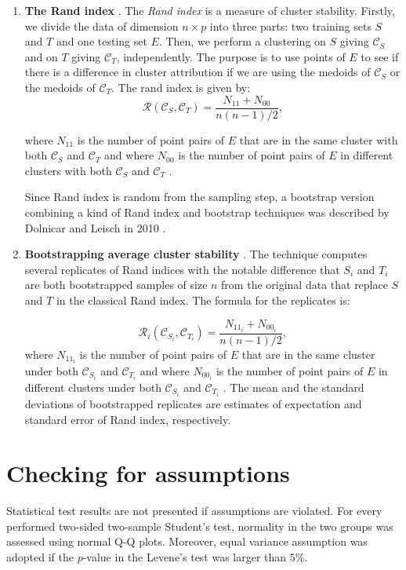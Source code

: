 \begin{enumerate}
\item \textbf{The Rand index} \cite{rand_objective_1971}. The \emph{Rand index} is a measure of cluster stability. Firstly, we divide the data of dimension $n \times p$ into three parts: two training sets $S$ and $T$ and one testing set $E$. Then, we perform a clustering on $S$ giving $\mathcal{C}_S$ and on $T$ giving $\mathcal{C}_T$, independently. The purpose is to use points of $E$ to see if there is a difference in cluster attribution if we are using the medoids of $\mathcal{C}_S$ or the medoids of $\mathcal{C}_T$. The rand index is given by:
\begin{equation*}
\mathcal{R}(\mathcal{C}_S,\mathcal{C}_T)=\frac{N_{11}+N_{00}}{n(n-1)/2},
\end{equation*}

where $N_{11}$ is the number of point pairs of $E$ that are in the same cluster with both $\mathcal{C}_S$ and $\mathcal{C}_T$ and where $N_{00}$ is the number of point pairs of $E$ in different clusters with both $\mathcal{C}_S$ and $\mathcal{C}_T$ \cite{hennig_handbook_2016}.

Since Rand index is random from the sampling step, a bootstrap version combining a kind of Rand index and bootstrap techniques was described by Dolnicar and Leisch in 2010 \cite{dolnicar_evaluation_2010}.

\item \textbf{Bootstrapping average cluster stability} \cite{dolnicar_evaluation_2010}. The technique computes several replicates of Rand indices with the notable difference that $S_i$ and $T_i$ are both bootstrapped samples of size $n$ from the original data that replace $S$ and $T$ in the classical Rand index. The formula for the replicates is:

\begin{equation*}
\mathcal{R}_i(\mathcal{C}_{S_i},\mathcal{C}_{T_i})=\frac{N_{{11}_i}+N_{{00}_i}}{n(n-1)/2},
\end{equation*}
where $N_{{11}_i}$ is the number of point pairs of $E$ that are in the same cluster under both $\mathcal{C}_{S_i}$ and $\mathcal{C}_{T_i}$ and where $N_{{00}_i}$ is the number of point pairs of $E$ in different clusters under both $\mathcal{C}_{S_i}$ and $\mathcal{C}_{T_i}$ \cite{dolnicar_evaluation_2010}. The mean and the standard deviations of bootstrapped replicates are estimates of expectation and standard error of Rand index, respectively.
\end{enumerate}


\section{Checking for assumptions}
Statistical test results are not presented if assumptions are violated. For every performed two-sided two-sample Student’s test, normality in the two groups was assessed using normal Q-Q plots. Moreover, equal variance assumption was adopted if the $p$-value in the Levene's test was larger than $5\%$.


